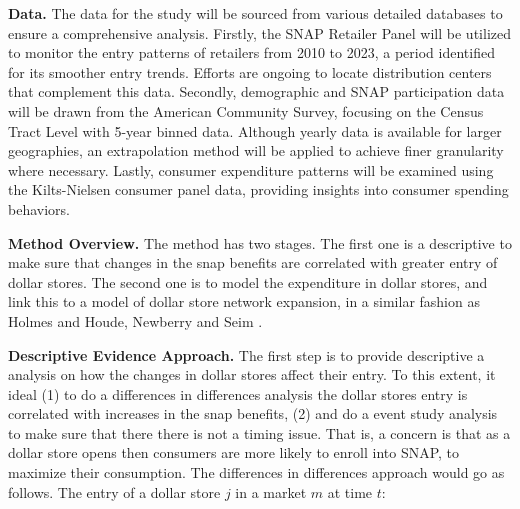 \documentclass[11pt]{article}
\begin{document}
\textbf{Data. } The data for the study will be sourced from various detailed databases to ensure a comprehensive analysis. Firstly, the SNAP Retailer Panel will be utilized to monitor the entry patterns of retailers from 2010 to 2023, a period identified for its smoother entry trends. Efforts are ongoing to locate distribution centers that complement this data. Secondly, demographic and SNAP participation data will be drawn from the American Community Survey, focusing on the Census Tract Level with 5-year binned data. Although yearly data is available for larger geographies, an extrapolation method will be applied to achieve finer granularity where necessary. Lastly, consumer expenditure patterns will be examined using the Kilts-Nielsen consumer panel data, providing insights into consumer spending behaviors.






       
     

\textbf{Method Overview. } The method has two stages. The first one is a descriptive to make sure that changes in the snap benefits are correlated with greater entry of dollar stores. The second one is to model the expenditure in dollar stores, and link this to a model of dollar store network expansion, in a similar fashion as Holmes \citeyear{holmes2011diffusion} and Houde, Newberry and Seim \citeyear{houde2023nexus}. 


\textbf{Descriptive Evidence Approach.} The first step is to provide descriptive a analysis on how the changes in dollar stores affect their entry. To this extent, it ideal (1) to do a differences in differences analysis the dollar stores entry is correlated with increases in the snap benefits, (2) and do a event study analysis to make sure that there there is not a timing issue. That is, a concern is that as a dollar store opens then consumers are more likely to enroll into SNAP, to maximize their consumption. The differences in differences approach would go as follows. The entry of a dollar store $j$ in a market $m$ at time $t$:
\end{document}
